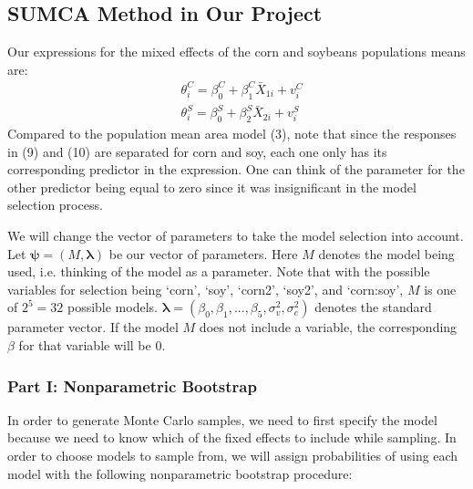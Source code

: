 \documentclass{article}
\begin{document}
\subsection{SUMCA Method in Our Project}

Our expressions for the mixed effects of the corn and soybeans populations means are:
\begin{align}
&\theta_i^C=\beta_0^C+\beta_1^C\bar{X}_{1i}+v_i^C \\
&\theta_i^S=\beta_0^S+\beta_2^S\bar{X}_{2i}+v_i^S
\end{align}
Compared to the population mean area model (3), note that since the responses in (9) and (10) are separated for corn and soy, each one only has its corresponding predictor in the expression. One can think of the parameter for the other predictor being equal to zero since it was insignificant in the model selection process.
\medbreak

We will change the vector of parameters to take the model selection into account. Let $\boldsymbol\psi = (M,\boldsymbol\lambda)$ be our vector of parameters. Here $M$ denotes the model being used, i.e. thinking of the model as a parameter. Note that with the possible variables for selection being `corn', `soy', `corn2', `soy2', and `corn:soy', $M$ is one of $2^5=32$ possible models. $\boldsymbol\lambda=(\beta_0,\beta_1,...,\beta_5,\sigma_v^2,\sigma_e^2)$ denotes the standard parameter vector. If the model $M$ does not include a variable, the corresponding $\beta$ for that variable will be 0.

\subsubsection{Part I: Nonparametric Bootstrap}

In order to generate Monte Carlo samples, we need to first specify the model because we need to know which of the fixed effects to include while sampling. In order to choose models to sample from, we will assign probabilities of using each model with the following nonparametric bootstrap procedure:
\medbreak
\end{document}
